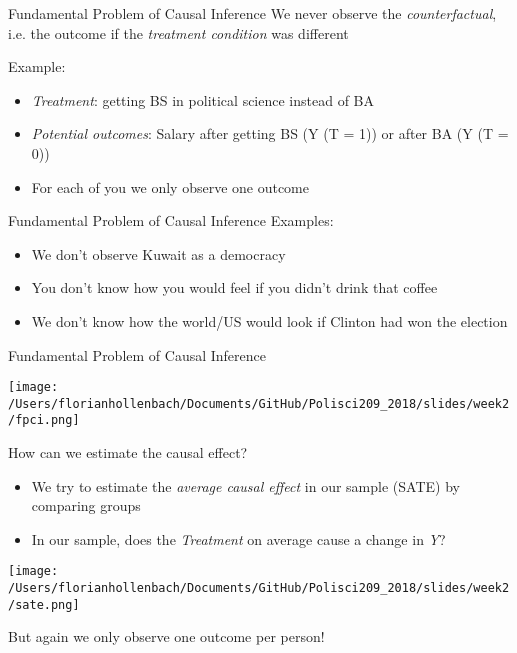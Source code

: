\documentclass[presentation]{beamer}
\begin{document}
\begin{frame}[label={sec:org645cf66}]{Fundamental Problem of Causal Inference}
We never observe the \emph{counterfactual}, i.e. the outcome if the \emph{treatment condition} was different

\pause
Example:
\begin{itemize}
\item \emph{Treatment}: getting BS in political science instead of BA
\item \emph{Potential outcomes}: Salary after getting BS (Y (T = 1)) or after BA (Y (T = 0))
\item For each of you we only observe one outcome
\end{itemize}
\end{frame}


\begin{frame}[label={sec:orgf6967c5}]{Fundamental Problem of Causal Inference}
Examples:

\begin{itemize}
\item We don't observe Kuwait as a democracy
\item You don't know how you would feel if you didn't drink that coffee
\item We don't know how the world/US would look if Clinton had won the election
\end{itemize}
\end{frame}



\begin{frame}[label={sec:orgf3e20a1}]{Fundamental Problem of Causal Inference}
\begin{center}
\texttt{[image: /Users/florianhollenbach/Documents/GitHub/Polisci209\_2018/slides/week2/fpci.png]}
\end{center}
\end{frame}


\begin{frame}[label={sec:org3c1903d}]{How can we estimate the causal effect?}
\begin{itemize}
\item We try to estimate the \emph{average causal effect} in our sample (SATE) by comparing groups
\item In our sample, does the \emph{Treatment} on average cause a change in \emph{Y}?
\end{itemize}
\pause
\begin{center}
\texttt{[image: /Users/florianhollenbach/Documents/GitHub/Polisci209\_2018/slides/week2/sate.png]}
\end{center}
But again we only observe one outcome per person!
\end{frame}
\end{document}
